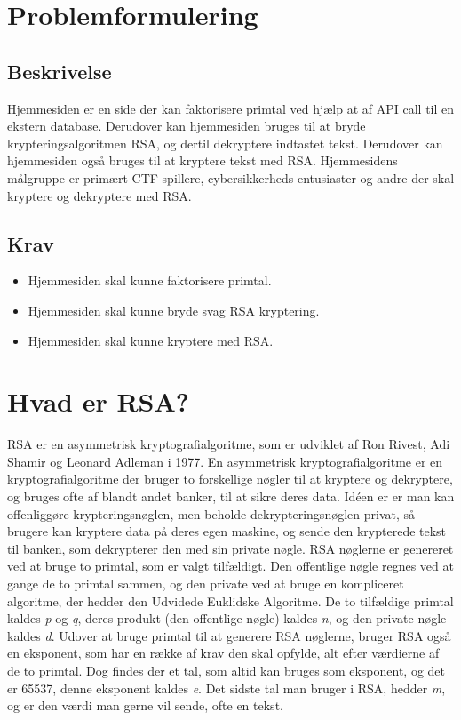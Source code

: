 \documentclass[a4paper,12pt]{extarticle}
\begin{document}
    \newpage


    \section{Problemformulering}\label{sec:problemformulering}

    \subsection{Beskrivelse}\label{subsec:beskrivelse}
    Hjemmesiden er en side der kan faktorisere primtal ved hjælp at af API call til en ekstern database.
    Derudover kan hjemmesiden bruges til at bryde krypteringsalgoritmen RSA, og dertil dekryptere indtastet tekst.
    Derudover kan hjemmesiden også bruges til at kryptere tekst med RSA. Hjemmesidens målgruppe er primært CTF
    spillere, cybersikkerheds entusiaster og andre der skal kryptere og dekryptere med RSA\@.

    \subsection{Krav}\label{subsec:krav}
    \begin{itemize}
        \item Hjemmesiden skal kunne faktorisere primtal.
        \item Hjemmesiden skal kunne bryde svag RSA kryptering.
        \item Hjemmesiden skal kunne kryptere med RSA\@.
    \end{itemize}



    \section{Hvad er RSA?}\label{sec:hvad-er-rsa}
    RSA er en asymmetrisk kryptografialgoritme, som er udviklet af Ron Rivest, Adi Shamir og Leonard Adleman i 1977.
    En asymmetrisk kryptografialgoritme er en kryptografialgoritme der bruger to forskellige nøgler til at kryptere og dekryptere,
    og bruges ofte af blandt andet banker, til at sikre deres data.
    Idéen er er man kan offenliggøre krypteringsnøglen, men beholde dekrypteringsnøglen privat, så brugere kan kryptere data på deres egen maskine,
    og sende den krypterede tekst til banken, som dekrypterer den med sin private nøgle.
    RSA nøglerne er genereret ved at bruge to primtal, som er valgt tilfældigt.
    Den offentlige nøgle regnes ved at gange de to primtal sammen, og den private ved at bruge en kompliceret algoritme,
    der hedder den Udvidede Euklidske Algoritme.\@
    De to tilfældige primtal kaldes \emph{p} og \emph{q}, deres produkt (den offentlige nøgle) kaldes \emph{n}, og den private nøgle kaldes \emph{d}.
    Udover at bruge primtal til at generere RSA nøglerne, bruger RSA også en eksponent, som har en række af krav den skal opfylde,
    alt efter værdierne af de to primtal.
    Dog findes der et tal, som altid kan bruges som eksponent, og det er 65537, denne eksponent kaldes \emph{e}.
    Det sidste tal man bruger i RSA, hedder \emph{m}, og er den værdi man gerne vil sende, ofte en tekst.\@
\end{document}
